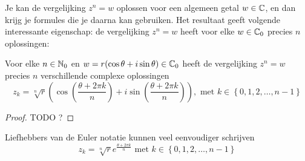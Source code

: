 \documentclass{ximera}
\begin{document}
Je kan de vergelijking $z^n=w$ oplossen voor een algemeen getal $w\in\mathbb{C}$, en dan krijg je formules die je daarna kan gebruiken. 
Het resultaat geeft volgende interessante eigenschap: de vergelijking $z^n=w$ heeft voor elke $w\in\mathbb{C}_0$ precies $n$ oplossingen:

\begin{proposition}
    Voor elke $n\in\mathbb{N}_0$ en $w=r(\cos\theta+i\sin\theta) \in\mathbb{C}_0$ heeft de vergelijking $z^n = w$ precies $n$ verschillende complexe oplossingen
    $$
    z_k = \sqrt[n]{r}\left( \cos\left( \frac{\theta + 2\pi k}{n}\right) + i\sin\left( \frac{\theta + 2\pi k}{n}\right) \right), \text{ met } k\in\left\{0,1,2,\ldots,n-1\right\}
    $$
\end{proposition}
\begin{proof}
TODO ?
\end{proof}

Liefhebbers van de Euler notatie kunnen veel eenvoudiger schrijven
$$
    z_k = \sqrt[n]{r} e^\frac{\theta + 2\pi k}{n} \text{ met } k\in\left\{0,1,2,\ldots,n-1\right\}
$$
\end{document}
